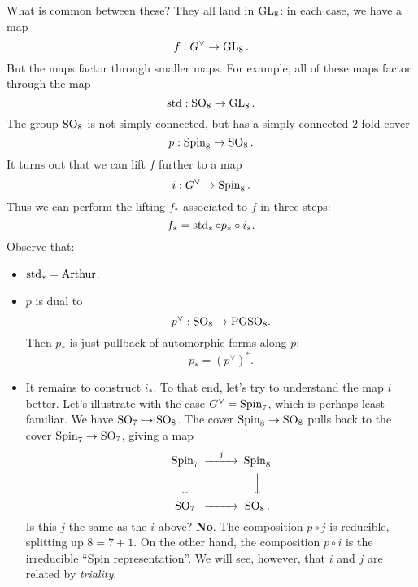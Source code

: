\documentclass[reqno]{amsart} 
\begin{document}
What is common between these?  They all land in $\operatorname{GL}_8$: in each case, we have a map
\begin{equation*}
  f : G^\vee  \rightarrow \operatorname{GL}_8.
\end{equation*}
But the maps factor through smaller maps.  For example, all of these maps factor through the map
\begin{equation*}
  \operatorname{std} : \operatorname{SO}_8 \rightarrow \operatorname{GL}_8.
\end{equation*}
The group $\operatorname{SO}_8$ is not simply-connected, but has a simply-connected $2$-fold cover
\begin{equation*}
  p : \operatorname{Spin}_8 \rightarrow \operatorname{SO}_8.
\end{equation*}
It turns out that we can lift $f$ further to a map
\begin{equation*}
  i : G^\vee \rightarrow \operatorname{Spin}_8.
\end{equation*}
Thus we can perform the lifting $f_*$ associated to $f$ in three steps:
\begin{equation*}
  f _\ast = \operatorname{std} _\ast \circ p _\ast \circ i _\ast.
\end{equation*}
Observe that:
\begin{itemize}
\item $\operatorname{std} _\ast = \mathrm{Arthur}$.
\item $p$ is dual to
  \begin{equation*}
    p^\vee : \operatorname{SO}_8 \rightarrow \mathrm{PGSO}_8.
  \end{equation*}
  Then $p _\ast $ is just pullback of automorphic forms along $p$:
  \begin{equation*}
    p _\ast = (p^\vee )^\ast.
  \end{equation*}
\item It remains to construct $i _\ast$.  To that end, let's try to understand the map $i$ better.  Let's illustrate with the case $G^\vee = \operatorname{Spin}_7$, which is perhaps least familiar.  We have $\operatorname{SO}_7 \hookrightarrow \operatorname{SO}_8$.  The cover $\operatorname{Spin}_8 \rightarrow \operatorname{SO}_8 $ pulls back to the cover $\operatorname{Spin}_7 \rightarrow \operatorname{SO}_7$, giving a map
  \begin{equation*}
    \begin{CD}         
      \Spin_7  @> j>> \Spin_8 \\
      @VVV  @VVV \\
      \SO_7  @>>> \SO_8.\\
    \end{CD}
  \end{equation*}
  Is this $j$ the same as the $i$ above?  \textbf{No}. The composition $p \circ j$ is reducible, splitting up $8 = 7 + 1$.  On the other hand, the composition $p \circ i$ is the irreducible ``Spin representation''.  We will see, however, that $i$ and $j$ are related by \emph{triality}.
\end{itemize}
\end{document}
